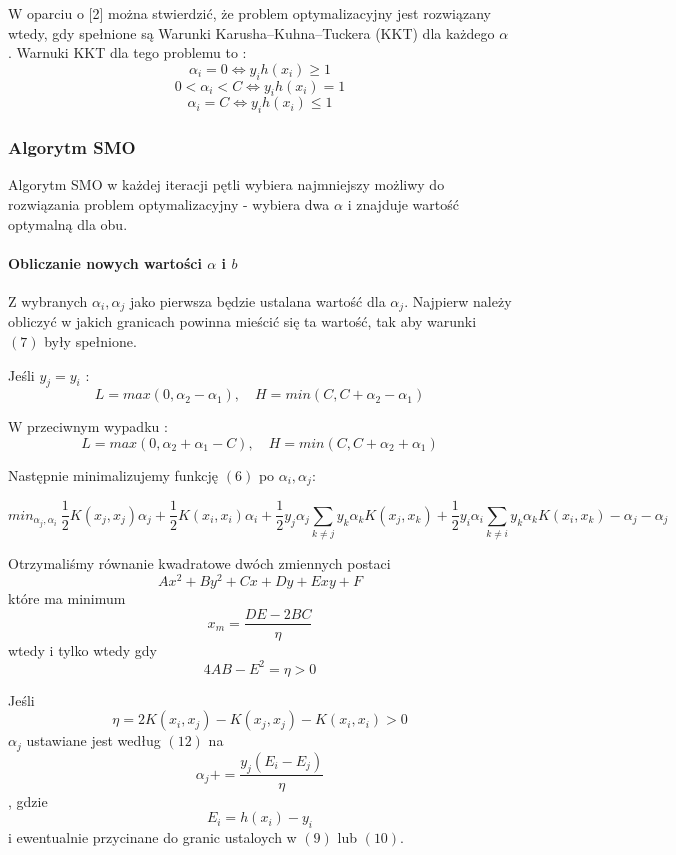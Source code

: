 \documentclass[11pt]{article}
\begin{document}
W oparciu o {[}2{]} można stwierdzić, że problem optymalizacyjny jest
rozwiązany wtedy, gdy spełnione są Warunki Karusha--Kuhna--Tuckera (KKT)
dla każdego \(\alpha\). Warnuki KKT dla tego problemu to :
\[ \alpha_i = 0 \Leftrightarrow y_i h(x_i) \ge 1 \]
\[ 0 < \alpha_i < C \Leftrightarrow y_i h(x_i)= 1 \]
\[ \alpha_i = C \Leftrightarrow  y_i h(x_i) \le 1 \]

    \hypertarget{algorytm-smo}{%
\subsubsection{Algorytm SMO}\label{algorytm-smo}}

Algorytm SMO w każdej iteracji pętli wybiera najmniejszy możliwy do
rozwiązania problem optymalizacyjny - wybiera dwa \(\alpha\) i znajduje
wartość optymalną dla obu.

\hypertarget{obliczanie-nowych-wartoux15bci-alpha-i-b}{%
\paragraph{\texorpdfstring{Obliczanie nowych wartości \(\alpha\) i
\(b\)}{Obliczanie nowych wartości \textbackslash alpha i b}}\label{obliczanie-nowych-wartoux15bci-alpha-i-b}}

Z wybranych \(\alpha_i, \alpha_j\) jako pierwsza będzie ustalana wartość
dla \(\alpha_j\). Najpierw należy obliczyć w jakich granicach powinna
mieścić się ta wartość, tak aby warunki \((7)\) były spełnione.

Jeśli \(y_j = y_i\) :
\[  L = max(0, \alpha_2-\alpha_1), \quad H = min(C, C+ \alpha_2 - \alpha_1)  \tag{9}\]

W przeciwnym wypadku :
\[  L = max(0, \alpha_2+\alpha_1 - C), \quad H = min(C, C+ \alpha_2 + \alpha_1)  \tag{10}\]

Następnie minimalizujemy funkcję \((6)\) po \(\alpha_i, \alpha_j\):

\[ min _{\alpha_j, \alpha_i} \  \frac{1}{2}K(x_j, x_j)\alpha_j + \frac{1}{2}K(x_i, x_i)\alpha_i + \frac{1}{2}y_j\alpha_j\sum_{k \neq j} y_k\alpha_k K(x_j, x_k) + \frac{1}{2}y_i\alpha_i\sum_{k \neq i} y_k\alpha_k K(x_i, x_k) - \alpha_j - \alpha_j   \tag{11}\]

Otrzymaliśmy równanie kwadratowe dwóch zmiennych postaci
\[ Ax^2 + By^2 + Cx + Dy + Exy + F \] które ma minimum
\[ x_m = \frac{DE - 2BC}{\eta}  \tag{12} \] wtedy i tylko wtedy gdy
\[ 4AB - E^2 = \eta > 0  \tag{13}\]

Jeśli
\[ \eta = 2K(x_i, x_j) - K(x_j, x_j) - K(x_i, x_i) > 0  \tag{14} \]
\(\alpha_j\) ustawiane jest według \((12)\) na
\[\alpha_j += \frac{y_j(E_i - E_j)}{\eta} \tag{15}\], gdzie
\[ E_i = h(x_i) - y_i \tag{16} \] i ewentualnie przycinane do granic
ustaloych w \((9)\) lub \((10)\).
\end{document}
